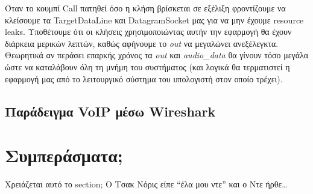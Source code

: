 \documentclass{article}
\begin{document}
Όταν το κουμπί Call πατηθεί όσο η κλήση βρίσκεται σε εξέλιξη φροντίζουμε να κλείσουμε τα TargetDataLine
και DatagramSocket μας για να μην έχουμε resource leaks. Υποθέτουμε ότι οι κλήσεις χρησιμοποιώντας 
αυτήν την εφαρμογή θα έχουν διάρκεια μερικών λεπτών, καθώς αφήνουμε το \textit{out} να μεγαλώνει 
ανεξέλεγκτα. Θεωρητικά αν περάσει επαρκής χρόνος τα \textit{out} και \textit{audio\_data} θα γίνουν 
τόσο μεγάλα ώστε να καταλάβουν όλη τη μνήμη του συστήματος (και λογικά θα τερματιστεί η εφαρμογή μας
από το λειτουργικό σύστημα του υπολογιστή στον οποίο τρέχει).


\subsection{Παράδειγμα VoIP μέσω Wireshark}
\section{Συμπεράσματα;}
Χρειάζεται αυτό το section; Ο Τσακ Νόρις είπε ``έλα μου ντε'' και ο Ντε ήρθε\ldots
\end{document}
